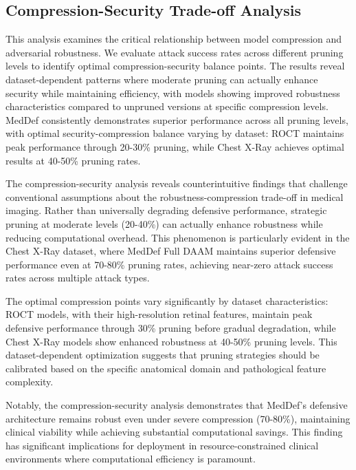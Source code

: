 \documentclass[preprint,12pt]{elsarticle}
\begin{document}
\subsection{Compression-Security Trade-off Analysis}
This analysis examines the critical relationship between model compression and adversarial robustness. We evaluate attack success rates across different pruning levels to identify optimal compression-security balance points. The results reveal dataset-dependent patterns where moderate pruning can actually enhance security while maintaining efficiency, with models showing improved robustness characteristics compared to unpruned versions at specific compression levels. MedDef consistently demonstrates superior performance across all pruning levels, with optimal security-compression balance varying by dataset: ROCT maintains peak performance through 20-30\% pruning, while Chest X-Ray achieves optimal results at 40-50\% pruning rates.

The compression-security analysis reveals counterintuitive findings that challenge conventional assumptions about the robustness-compression trade-off in medical imaging. Rather than universally degrading defensive performance, strategic pruning at moderate levels (20-40\%) can actually enhance robustness while reducing computational overhead. This phenomenon is particularly evident in the Chest X-Ray dataset, where MedDef Full DAAM maintains superior defensive performance even at 70-80\% pruning rates, achieving near-zero attack success rates across multiple attack types.

The optimal compression points vary significantly by dataset characteristics: ROCT models, with their high-resolution retinal features, maintain peak defensive performance through 30\% pruning before gradual degradation, while Chest X-Ray models show enhanced robustness at 40-50\% pruning levels. This dataset-dependent optimization suggests that pruning strategies should be calibrated based on the specific anatomical domain and pathological feature complexity.

Notably, the compression-security analysis demonstrates that MedDef's defensive architecture remains robust even under severe compression (70-80\%), maintaining clinical viability while achieving substantial computational savings. This finding has significant implications for deployment in resource-constrained clinical environments where computational efficiency is paramount.
\end{document}

